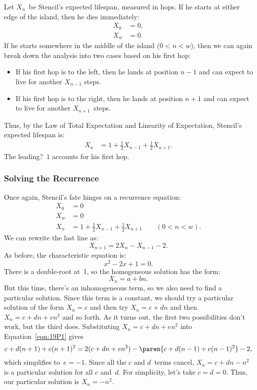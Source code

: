 Let $X_n$~be Stencil's expected lifespan, measured in hops.  If he
starts at either edge of the island, then he dies immediately:
%
\begin{align*}
X_0 & = 0, \\
X_w & = 0.
\end{align*}
%
If he starts somewhere in the middle of the island ($0 < n < w$), then
we can again break down the analysis into two cases based on his first
hop:
%
\begin{itemize}

\item

If his first hop is to the left, then he lands at position $n-1$ and
can expect to live for another $X_{n-1}$ steps.

\item

If his first hop is to the right, then he lands at position $n+1$ and
can expect to live for another $X_{n+1}$~steps.

\end{itemize}
%
Thus, by the Law of Total Expectation and Linearity of Expectation,
Stencil's expected lifespan is:
%
\begin{align*}
    X_n & = 1 + \frac{1}{2} X_{n-1} + \frac{1}{2} X_{n+1}.
\end{align*}
%
The leading?~$1$ accounts for his first hop.

\subsubsection{Solving the Recurrence}

Once again, Stencil's fate hinges on a recurrence equation:
%
\[
\begin{array}{rl}
X_0 & = 0 \\
X_w & = 0 \\
X_n & = 1 + \frac{1}{2} X_{n-1} + \frac{1}{2} X_{n+1} \qquad (0 < n < w).
\end{array}
\]
%
We can rewrite the last line as:
%
\begin{equation}\label{eqn:19P1}
    X_{n+1} = 2 X_n - X_{n-1} - 2.
\end{equation}
%
As before, the characteristic equation is:
%
\[
    x^2 - 2 x + 1 = 0.
\]
%
There is a double-root at~1, so the homogeneous solution has the form:
%
\[
    X_n = a + b n.
\]
%
But this time, there's an inhomogeneous term, so we also need to find a
particular solution.  Since this term is a constant, we should try a
particular solution of the form $X_n = c$ and then try $X_n = c + d n$
and then $X_n = c + d n + e n^2$ and so forth.  As it turns out, the
first two possibilities don't work, but the third does.  Substituting
$X_n = c + d n + e n^2$ into Equation~\ref{eqn:19P1} gives
%
\begin{equation*}
c + d(n+1) + e(n+1)^2 = 2 (c + dn + en^2)
    - \paren{c + d(n-1) + e(n-1)^2} - 2,
\end{equation*}
which simplifies to~$e = -1$.  Since all the $c$ and $d$~terms cancel,
$X_n = c + d n - n^2$ is a particular solution for all $c$ and~$d$.
For simplicity, let's take $c = d = 0$.  Thus, our particular solution
is $X_n = - n^2$.

